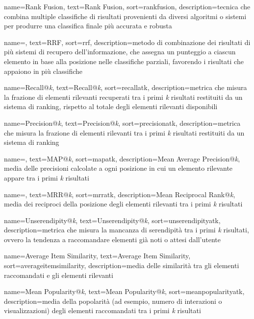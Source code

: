  {
    name=Rank Fusion,
    text=Rank Fusion,
    sort=rankfusion,
    description={tecnica che combina multiple classifiche di risultati provenienti da diversi algoritmi o sistemi per produrre una classifica finale più accurata e robusta}
}

 {
    name=,
    text=RRF,
    sort=rrf,
    description={metodo di combinazione dei risultati di più sistemi di recupero dell'informazione, che assegna un punteggio a ciascun elemento in base alla posizione nelle classifiche parziali, favorendo i risultati che appaiono in più classifiche}
}

 {
    name=Recall@\emph{k},
    text=Recall@\emph{k},
    sort=recallatk,
    description={metrica che misura la frazione di elementi rilevanti recuperati tra i primi \emph{k} risultati restituiti da un sistema di ranking, rispetto al totale degli elementi rilevanti disponibili}
}

 {
    name=Precision@\emph{k},
    text=Precision@\emph{k},
    sort=precisionatk,
    description={metrica che misura la frazione di elementi rilevanti tra i primi \emph{k} risultati restituiti da un sistema di ranking}
}

 {
    name=,
    text=MAP@\emph{k},
    sort=mapatk,
    description={Mean Average Precision@\emph{k}, media delle precisioni calcolate a ogni posizione in cui un elemento rilevante appare tra i primi \emph{k} risultati}
}

 {
    name=,
    text=MRR@\emph{k},
    sort=mrratk,
    description={Mean Reciprocal Rank@\emph{k}, media dei reciproci della posizione degli elementi rilevanti tra i primi \emph{k} risultati}
}

 {
    name=Unserendipity@\emph{k},
    text=Unserendipity@\emph{k},
    sort=unserendipityatk,
    description={metrica che misura la mancanza di serendipità tra i primi \emph{k} risultati, ovvero la tendenza a raccomandare elementi già noti o attesi dall'utente}
}

 {
    name=Average Item Similarity,
    text=Average Item Similarity,
    sort=averageitemsimilarity,
    description={media delle similarità tra gli elementi raccomandati e gli elementi rilevanti}
}

 {
    name=Mean Popularity@\emph{k},
    text=Mean Popularity@\emph{k},
    sort=meanpopularityatk,
    description={media della popolarità (ad esempio, numero di interazioni o visualizzazioni) degli elementi raccomandati tra i primi \emph{k} risultati}
}

